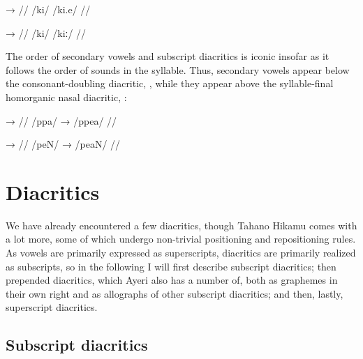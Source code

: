 \pex[lingstyle=thex]
\a\label{ex:kie}\begingl
	\gla {}	→	 //
	\glb /ki/	{}	/ki.e/ //
\endgl

\a\label{ex:kii}\begingl
	\gla {}	→	 //
	\glb /ki/	{}	/kiː/ //
\endgl

\xe

The order of secondary vowels and subscript diacritics is iconic insofar as 
it follows the order of sounds in the syllable. Thus, secondary vowels appear 
below the consonant-doubling diacritic, , while they appear above the 
syllable-final homorganic nasal diacritic, :

\pex[lingstyle=thex]\label{ex:subscrord}
\a\begingl
	\gla {}	→	 //
	\glb /ppa/	→	/ppea/ //
\endgl

\a\begingl
	\gla {}	→	 //
	\glb /peN/	→	/peaN/ //
\endgl
\xe


\section{Diacritics}

We have already encountered a few diacritics, though Tahano Hikamu comes with 
a lot more, some of which undergo non-trivial positioning and repositioning 
rules. As vowels are primarily expressed as superscripts, diacritics are 
primarily realized as subscripts, so in the following I will first describe 
subscript diacritics; then prepended diacritics, which Ayeri also has a number 
of, both as graphemes in their own right and as allographs of other subscript 
diacritics; and then, lastly, superscript diacritics.

\subsection{Subscript diacritics}

